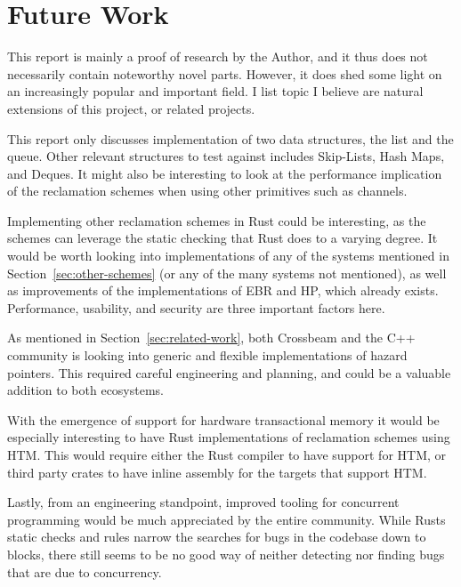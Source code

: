 \documentclass[b5paper]{report}
\begin{document}
\section{Future Work}

This report is mainly a proof of research by the Author, and it thus does not
necessarily contain noteworthy novel parts. However, it does shed some light on
an increasingly popular and important field. I list topic I believe are natural
extensions of this project, or related projects.

This report only discusses implementation of two data structures, the list and
the queue. Other relevant structures to test against includes Skip-Lists,
Hash Maps, and Deques. It might also be interesting to look at the performance
implication of the reclamation schemes when using other primitives such as
channels.

Implementing other reclamation schemes in Rust could be interesting, as the
schemes can leverage the static checking that Rust does to a varying degree.  It
would be worth looking into implementations of any of the systems mentioned in
Section~\ref{sec:other-schemes} (or any of the many systems not mentioned), as
well as improvements of the implementations of EBR and HP, which already exists.
Performance, usability, and security are three important factors here.

As mentioned in Section~\ref{sec:related-work}, both Crossbeam and the C++
community is looking into generic and flexible implementations of hazard
pointers. This required careful engineering and planning, and could be a
valuable addition to both ecosystems.

With the emergence of support for hardware transactional memory it would be
especially interesting to have Rust implementations of reclamation schemes using
HTM\@. This would require either the Rust compiler to have support for HTM, or
third party crates to have inline assembly for the targets that support HTM\@.

Lastly, from an engineering standpoint, improved tooling for concurrent
programming would be much appreciated by the entire community. While Rusts
static checks and rules narrow the searches for bugs in the codebase down to
 blocks, there still seems to be no good way of neither detecting
nor finding bugs that are due to concurrency.




\end{document}
